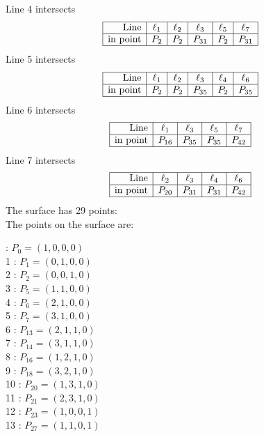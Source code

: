\documentclass{article}
\begin{document}
{$$$$
Line 4 intersects 
$$
\begin{array}{|r*{5}{|c}|}
\hline
\mbox{Line}  & \ell_{1} & \ell_{2} & \ell_{3} & \ell_{5} & \ell_{7}\\
\hline
\mbox{in point}  & P_{2} & P_{2} & P_{31} & P_{2} & P_{31}\\
\hline
\end{array}
$$
Line 5 intersects 
$$
\begin{array}{|r*{5}{|c}|}
\hline
\mbox{Line}  & \ell_{1} & \ell_{2} & \ell_{3} & \ell_{4} & \ell_{6}\\
\hline
\mbox{in point}  & P_{2} & P_{2} & P_{35} & P_{2} & P_{35}\\
\hline
\end{array}
$$
Line 6 intersects 
$$
\begin{array}{|r*{4}{|c}|}
\hline
\mbox{Line}  & \ell_{1} & \ell_{3} & \ell_{5} & \ell_{7}\\
\hline
\mbox{in point}  & P_{16} & P_{35} & P_{35} & P_{42}\\
\hline
\end{array}
$$
Line 7 intersects 
$$
\begin{array}{|r*{4}{|c}|}
\hline
\mbox{Line}  & \ell_{2} & \ell_{3} & \ell_{4} & \ell_{6}\\
\hline
\mbox{in point}  & P_{20} & P_{31} & P_{31} & P_{42}\\
\hline
\end{array}
$$
The surface has 29 points:\\
The points on the surface are:\\
\begin{multicols}{3}
 : $P_{0}=( 1, 0, 0, 0 )$\\
1 : $P_{1}=( 0, 1, 0, 0 )$\\
2 : $P_{2}=( 0, 0, 1, 0 )$\\
3 : $P_{5}=( 1, 1, 0, 0 )$\\
4 : $P_{6}=( 2, 1, 0, 0 )$\\
5 : $P_{7}=( 3, 1, 0, 0 )$\\
6 : $P_{13}=( 2, 1, 1, 0 )$\\
7 : $P_{14}=( 3, 1, 1, 0 )$\\
8 : $P_{16}=( 1, 2, 1, 0 )$\\
9 : $P_{18}=( 3, 2, 1, 0 )$\\
10 : $P_{20}=( 1, 3, 1, 0 )$\\
11 : $P_{21}=( 2, 3, 1, 0 )$\\
12 : $P_{23}=( 1, 0, 0, 1 )$\\
13 : $P_{27}=( 1, 1, 0, 1 )$\\

\end{multicols}}
\end{document}

